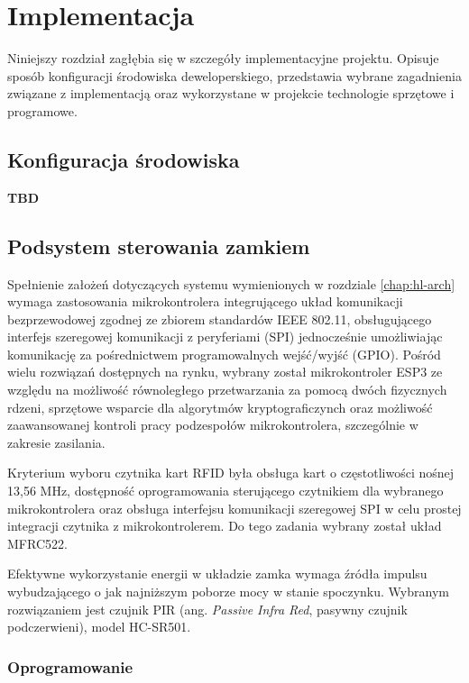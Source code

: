 \chapter{Implementacja}
\label{chap:implementation}

    Niniejszy rozdział zagłębia się w szczegóły implementacyjne projektu. Opisuje sposób konfiguracji środowiska deweloperskiego, przedstawia wybrane zagadnienia związane z implementacją oraz wykorzystane w projekcie technologie sprzętowe i programowe.

    \section{Konfiguracja środowiska}
        \textbf{TBD}

    \section{Podsystem sterowania zamkiem}

        Spełnienie założeń dotyczących systemu wymienionych w rozdziale \ref{chap:hl-arch} wymaga zastosowania mikrokontrolera integrującego układ komunikacji bezprzewodowej zgodnej ze zbiorem standardów IEEE 802.11, obsługującego interfejs szeregowej komunikacji z peryferiami (SPI) jednocześnie umożliwiając komunikację za pośrednictwem programowalnych wejść/wyjść (GPIO). Pośród wielu rozwiązań  dostępnych na rynku, wybrany został mikrokontroler ESP3 ze względu na możliwość równoległego przetwarzania za pomocą dwóch fizycznych rdzeni, sprzętowe wsparcie dla algorytmów kryptograficzynch oraz możliwość zaawansowanej kontroli pracy podzespołów mikrokontrolera, szczególnie w zakresie zasilania.

        Kryterium wyboru czytnika kart RFID była obsługa kart o częstotliwości nośnej 13,56 MHz, dostępność oprogramowania sterującego czytnikiem dla wybranego mikrokontrolera oraz obsługa interfejsu komunikacji szeregowej SPI w celu prostej integracji czytnika z mikrokontrolerem. Do tego zadania wybrany został układ MFRC522.

        Efektywne wykorzystanie energii w układzie zamka wymaga źródła impulsu wybudzającego o jak najniższym poborze mocy w stanie spoczynku. Wybranym rozwiązaniem jest czujnik PIR (ang. \textit{Passive Infra Red}, pasywny czujnik podczerwieni), model HC-SR501.

        \subsection{Oprogramowanie}

